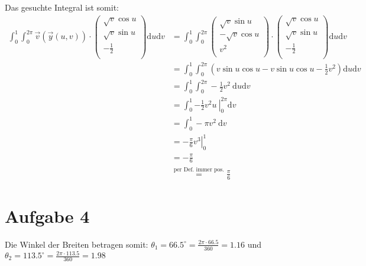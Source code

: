 \documentclass[10pt,a4paper,parskip=half]{scrartcl}
\newcommand{\vecthree}[3]{\begin{pmatrix}#1\\#2\\#3\\\end {pmatrix}}
\begin{document}
Das gesuchte Integral ist somit:
\begin{align*}
\int_0^1 \int_0^{2\pi} \vec v(\vec y(u,v)) \cdot \vecthree{\sqrt{v}\cos u}{\sqrt{v}\sin u}{-\frac 1 2} \mathrm d u \mathrm d v &= \int_0^1 \int_0^{2\pi} \vecthree{\sqrt v\sin u}{-\sqrt v\cos u}{v^2} \cdot \vecthree{\sqrt{v}\cos u}{\sqrt{v}\sin u}{-\frac 1 2} \mathrm d u \mathrm d v \\
&= \int_0^1 \int_0^{2\pi} \left(v \sin u \cos u - v \sin u \cos u - \frac 1 2 v^2\right) \mathrm d u \mathrm d v \\
&= \int_0^1 \int_0^{2\pi} - \frac 1 2 v^2~ \mathrm d u \mathrm d v \\
&= \int_0^1 \left. - \frac 1 2 v^2 u~ \right|_0^{2\pi} \mathrm d v \\
&= \int_0^1 - \pi v^2 ~ \mathrm d v \\
&= \left. - \frac \pi 6 v^3 \right|_0^1 \\
&= -\frac \pi 6 \\
&\overset{\text{per Def. immer pos.}}{=} \frac \pi 6
\end{align*}
\section*{Aufgabe 4}
Die Winkel der Breiten betragen somit: $\theta_1 = 66.5^{\circ} = \frac{2\pi \cdot 66.5}{360} = 1.16$ und $\theta_2 = 113.5^{\circ} = \frac{2\pi \cdot 113.5}{360} = 1.98$
\end{document}
